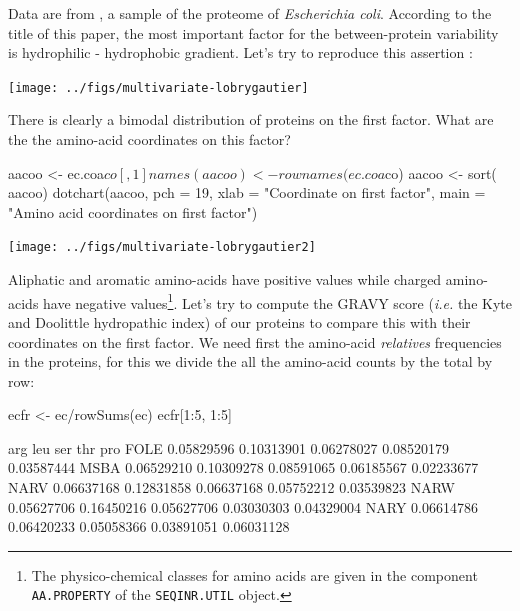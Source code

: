 \documentclass{article}
\begin{document}
Data are from \cite{lobrygautier}, a sample of the proteome of
\textit{Escherichia coli}. According to the title of this paper,
the most important factor for the between-protein variability is
hydrophilic - hydrophobic gradient. Let's try to reproduce this
assertion :

\begin{Schunk}
\end{Schunk}
\texttt{[image: ../figs/multivariate-lobrygautier]}

There is clearly a bimodal distribution of proteins on the first factor. What are the
the amino-acid coordinates on this factor?

\begin{Schunk}
\begin{Sinput}
 aacoo <- ec.coa$co[ , 1]
 names(aacoo) <- rownames(ec.coa$co)
 aacoo <- sort( aacoo)
 dotchart(aacoo, pch = 19, xlab = "Coordinate on first factor",
 main = "Amino acid coordinates on first factor")
\end{Sinput}
\end{Schunk}
\texttt{[image: ../figs/multivariate-lobrygautier2]}

Aliphatic and aromatic amino-acids have positive values while charged amino-acids
have negative values\footnote{The physico-chemical classes for amino acids are
given in the component \texttt{AA.PROPERTY} of the \texttt{SEQINR.UTIL}
object.}. Let's try to compute the GRAVY score (\textit{i.e.} the Kyte and Doolittle 
hydropathic index\cite{KD}) of our proteins to compare this with their coordinates 
on the first factor. We need first the amino-acid \emph{relatives} frequencies in the
proteins, for this we divide the all the amino-acid counts by the total by row:

\begin{Schunk}
\begin{Sinput}
 ecfr <- ec/rowSums(ec)
 ecfr[1:5, 1:5]
\end{Sinput}
\begin{Soutput}
            arg        leu        ser        thr        pro
FOLE 0.05829596 0.10313901 0.06278027 0.08520179 0.03587444
MSBA 0.06529210 0.10309278 0.08591065 0.06185567 0.02233677
NARV 0.06637168 0.12831858 0.06637168 0.05752212 0.03539823
NARW 0.05627706 0.16450216 0.05627706 0.03030303 0.04329004
NARY 0.06614786 0.06420233 0.05058366 0.03891051 0.06031128
\end{Soutput}
\end{Schunk}
\end{document}
